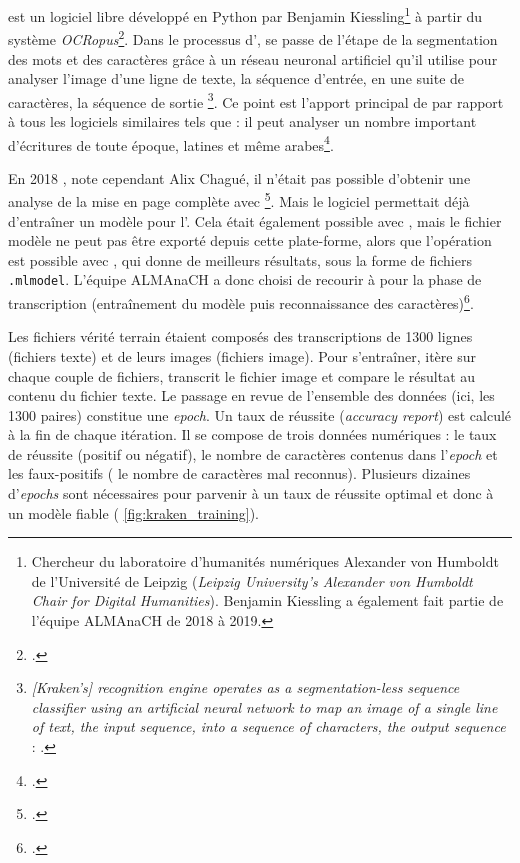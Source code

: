 \kraken{} est un logiciel libre développé en Python par Benjamin Kiessling\footnote{Chercheur du laboratoire d'humanités numériques \og Alexander von Humboldt \fg{} de l'Université de Leipzig (\textit{Leipzig  University’s  Alexander  von  Humboldt  Chair for Digital Humanities}). Benjamin Kiessling a également fait partie de l'équipe ALMAnaCH de 2018 à 2019.} à partir du système \textit{OCRopus}\footcite{kiessling}. Dans le processus d'\ocr, \kraken{} se passe de l'étape de la segmentation des mots et des caractères grâce à un \og réseau neuronal artificiel \fg{} qu'il utilise \og pour analyser l'image d'une ligne de texte, la séquence d'entrée, en une suite de caractères, la séquence de sortie \fg{}\footnote{\og \textit{[Kraken's] recognition engine operates as a segmentation-less sequence classifier using an artificial neural network to map an image of a single line of text, the input sequence, into a sequence of characters, the output sequence} : \cite{kiessling}.}. Ce point est l'apport principal de \kraken{} par rapport à tous les logiciels similaires tels que \transkribus{} : il peut analyser un nombre important d'écritures de toute époque, latines et même arabes\footcite{kiesslingarabe}.

\og En 2018 \fg, note cependant Alix Chagué, \og il n’était pas possible d’obtenir une analyse de la mise en page complète avec \kraken \fg{}\footcite{chague2}. Mais le logiciel permettait déjà d'entraîner un modèle pour l'\ocr. Cela était également possible avec \transkribus, mais le fichier modèle ne peut pas être exporté depuis cette plate-forme, alors que l'opération est possible avec \kraken{}, qui donne de meilleurs résultats, sous la forme de fichiers \texttt{.mlmodel}. L'équipe ALMAnaCH a donc choisi de recourir à \kraken{} pour la phase de transcription (entraînement du modèle puis reconnaissance des caractères)\footcite{chague2}.

Les fichiers \og vérité terrain \fg{} étaient composés des transcriptions de 1300 lignes (fichiers texte) et de leurs images (fichiers image). Pour s'entraîner, \kraken{} itère sur chaque couple de fichiers, transcrit le fichier image et compare le résultat au contenu du fichier texte. Le passage en revue de l'ensemble des données (ici, les 1300 paires) constitue une \textit{epoch}. Un taux de réussite (\textit{accuracy report}) est calculé à la fin de chaque itération. Il se compose de trois données numériques : le taux de réussite (positif ou négatif), le nombre de caractères contenus dans l'\textit{epoch} et les faux-positifs (\cad{} le nombre de caractères mal reconnus). Plusieurs dizaines d'\textit{epochs} sont nécessaires pour parvenir à un taux de réussite optimal et donc à un modèle fiable (\fig{} \ref{fig:kraken_training}).

